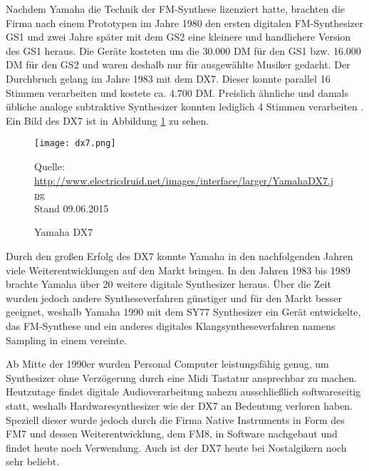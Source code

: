 Nachdem Yamaha die Technik der FM-Synthese lizenziert hatte, brachten die Firma nach einem Prototypen im Jahre 1980 den ersten digitalen FM-Synthesizer GS1 und zwei Jahre später mit dem GS2 eine kleinere und handlichere Version des GS1 heraus. Die Geräte kosteten um die 30.000 DM für den GS1 bzw. 16.000 DM für den GS2 und waren deshalb nur für ausgewählte Musiker gedacht. Der Durchbruch gelang im Jahre 1983 mit dem DX7. Dieser konnte parallel 16 Stimmen verarbeiten und kostete ca. 4.700 DM. Preislich ähnliche und damals übliche analoge subtraktive Synthesizer konnten lediglich 4 Stimmen verarbeiten \cite{fmGS1}. Ein Bild des DX7 ist in Abbildung \ref{fig:dx7} zu sehen.

 \begin{figure} [ht]
\centering
  \texttt{[image: dx7.png]}
\caption{Yamaha DX7}
\label{fig:dx7}
Quelle: \url{http://www.electricdruid.net/images/interface/larger/YamahaDX7.jpg}
\\Stand 09.06.2015
\end{figure}

Durch den großen Erfolg des DX7 konnte Yamaha in den nachfolgenden Jahren viele Weiterentwicklungen auf den Markt bringen. In den Jahren 1983 bis 1989 brachte Yamaha über 20 weitere digitale Synthesizer heraus. Über die Zeit wurden jedoch andere Syntheseverfahren günstiger und für den Markt besser geeignet, weshalb Yamaha 1990 mit dem SY77 Synthesizer ein Gerät entwickelte, das FM-Synthese und ein anderes digitales Klangsyntheseverfahren namens Sampling in einem vereinte.\cite{fmGS1}

Ab Mitte der 1990er wurden Personal Computer leistungsfähig genug, um Synthesizer ohne Verzögerung durch eine Midi Tastatur ansprechbar zu machen. Heutzutage findet digitale Audioverarbeitung nahezu ausschließlich softwareseitig statt, weshalb Hardwaresynthesizer wie der DX7 an Bedeutung verloren haben. Speziell dieser wurde jedoch durch die Firma Native Instruments in Form des FM7 und dessen Weiterentwicklung, dem FM8, in Software nachgebaut und findet heute noch Verwendung. Auch ist der DX7 heute bei Nostalgikern noch sehr beliebt.\cite{fmGS1}